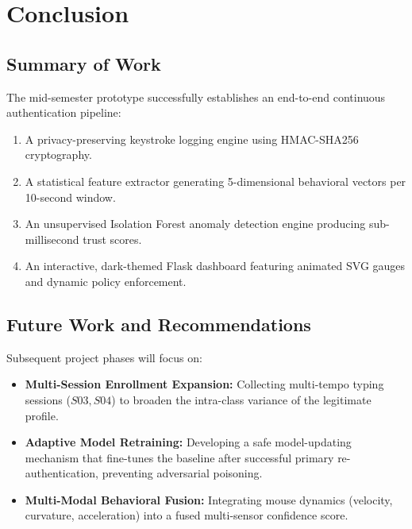 \documentclass[12pt, a4paper, oneside]{report}
\begin{document}
\chapter{Conclusion}

\section{Summary of Work}
The mid-semester prototype successfully establishes an end-to-end continuous authentication pipeline:
\begin{enumerate}
    \item A privacy-preserving keystroke logging engine using HMAC-SHA256 cryptography.
    \item A statistical feature extractor generating 5-dimensional behavioral vectors per 10-second window.
    \item An unsupervised Isolation Forest anomaly detection engine producing sub-millisecond trust scores.
    \item An interactive, dark-themed Flask dashboard featuring animated SVG gauges and dynamic policy enforcement.
\end{enumerate}

\section{Future Work and Recommendations}
Subsequent project phases will focus on:
\begin{itemize}
    \item \textbf{Multi-Session Enrollment Expansion:} Collecting multi-tempo typing sessions ($S03, S04$) to broaden the intra-class variance of the legitimate profile.
    \item \textbf{Adaptive Model Retraining:} Developing a safe model-updating mechanism that fine-tunes the baseline after successful primary re-authentication, preventing adversarial poisoning.
    \item \textbf{Multi-Modal Behavioral Fusion:} Integrating mouse dynamics (velocity, curvature, acceleration) into a fused multi-sensor confidence score.
\end{itemize}
\end{document}

